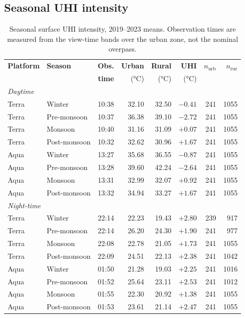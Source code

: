 \documentclass[11pt,a4paper]{article}
\begin{document}
\subsection{Seasonal UHI intensity}

\begin{table}[htbp]
\centering
\small
\begin{tabular}{llrrrrrr}
\toprule
\textbf{Platform} & \textbf{Season} & \textbf{Obs.} &
\textbf{Urban} & \textbf{Rural} & \textbf{UHI} &
$n_{\mathrm{urb}}$ & $n_{\mathrm{rur}}$ \\
 & & \textbf{time} & (\si{\degreeCelsius}) & (\si{\degreeCelsius}) &
(\si{\degreeCelsius}) & & \\
\midrule
\multicolumn{8}{l}{\textit{Daytime}} \\
Terra & Winter       & 10:38 & 32.10 & 32.50 & $-0.41$ & 241 & 1055 \\
Terra & Pre-monsoon  & 10:37 & 36.38 & 39.10 & $-2.72$ & 241 & 1055 \\
Terra & Monsoon      & 10:40 & 31.16 & 31.09 & $+0.07$ & 241 & 1055 \\
Terra & Post-monsoon & 10:32 & 32.62 & 30.96 & $+1.67$ & 241 & 1055 \\
Aqua  & Winter       & 13:27 & 35.68 & 36.55 & $-0.87$ & 241 & 1055 \\
Aqua  & Pre-monsoon  & 13:28 & 39.60 & 42.24 & $-2.64$ & 241 & 1055 \\
Aqua  & Monsoon      & 13:31 & 32.99 & 32.07 & $+0.92$ & 241 & 1055 \\
Aqua  & Post-monsoon & 13:32 & 34.94 & 33.27 & $+1.67$ & 241 & 1055 \\
\midrule
\multicolumn{8}{l}{\textit{Night-time}} \\
Terra & Winter       & 22:14 & 22.23 & 19.43 & $+2.80$ & 239 &  917 \\
Terra & Pre-monsoon  & 22:14 & 26.20 & 24.30 & $+1.90$ & 241 &  977 \\
Terra & Monsoon      & 22:08 & 22.78 & 21.05 & $+1.73$ & 241 & 1055 \\
Terra & Post-monsoon & 22:09 & 24.51 & 22.13 & $+2.38$ & 241 & 1042 \\
Aqua  & Winter       & 01:50 & 21.28 & 19.03 & $+2.25$ & 241 & 1016 \\
Aqua  & Pre-monsoon  & 01:52 & 25.64 & 23.11 & $+2.53$ & 241 & 1012 \\
Aqua  & Monsoon      & 01:55 & 22.30 & 20.92 & $+1.38$ & 241 & 1055 \\
Aqua  & Post-monsoon & 01:53 & 23.61 & 21.14 & $+2.47$ & 241 & 1055 \\
\bottomrule
\end{tabular}
\caption{Seasonal surface UHI intensity, 2019--2023 means. Observation
times are measured from the view-time bands over the urban zone, not
the nominal overpass.}
\label{tab:headline}
\end{table}
\end{document}
